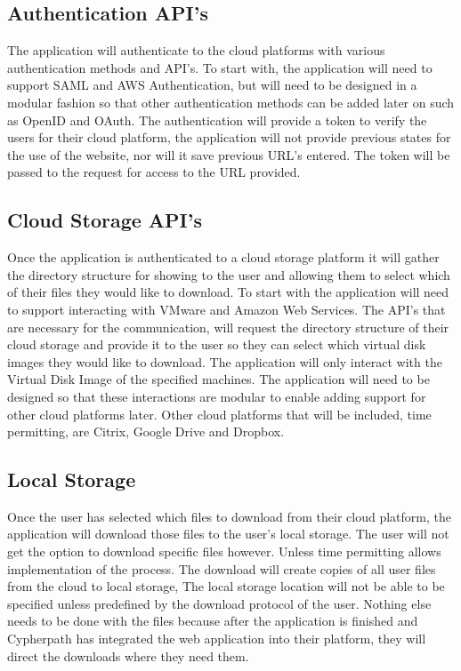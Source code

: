 \documentclass{article}
\begin{document}
        
        \subsection{Authentication API's}
        The application will authenticate to the cloud platforms with various authentication methods and API's. To start with, the application will need to support
        SAML and AWS Authentication, but will need to be designed in a modular fashion so that other authentication methods can be added later on such as OpenID and OAuth.
        The authentication will provide a token to verify the users for their cloud platform, the application will not provide previous states for the use of the 
        website, nor will it save previous URL's entered. The token will be passed to the request for access to the URL provided.


        \subsection{Cloud Storage API's}
        Once the application is authenticated to a cloud storage platform it will gather the directory structure for showing to the user and allowing them to select
        which of their files they would like to download. To start with the application will need to support interacting with VMware and Amazon Web Services. The API's
        that are necessary for the communication, will request the directory structure of their cloud storage and provide it to the user so they can select which virtual disk
        images they would like to download. The application will only interact with the Virtual Disk Image of the specified machines. The application will need to be designed so 
        that these interactions are modular to enable adding support for other cloud platforms later. Other cloud platforms that will be included, time permitting, are 
        Citrix, Google Drive and Dropbox.


        \subsection{Local Storage}
        Once the user has selected which files to download from their cloud platform, the application will download those
        files to the user's local storage. The user will not get the option to download specific files however. Unless time permitting
        allows implementation of the process. The download will create copies of all user files from the cloud to local storage, 
        The local storage location will not be able to be specified unless predefined by the download protocol of the user. Nothing else 
        needs to be done with the files because after the application is finished and Cypherpath has integrated the web application into 
        their platform, they will direct the downloads where they need them.
\end{document}
